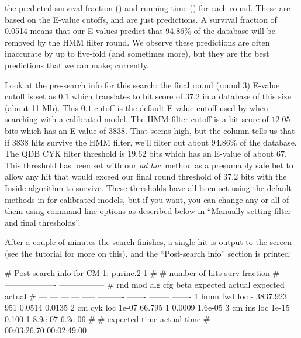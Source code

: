 \begin{wideitem}
\item[\emprog{predictions}] the predicted survival fraction
  () and running time () for each
  round. These are based on the E-value cutoffs, and are just
  predictions. A survival fraction of 0.0514 means that our E-values
  predict that 94.86\% of the database will be removed by the HMM
  filter round. We observe these predictions are often inaccurate by up
  to five-fold (and sometimes more), but they are the best predictions
  that we can make; currently.
\end{wideitem}

Look at the pre-search info for this search: the final round (round 3)
E-value cutoff is set as $0.1$ which translates to bit score of $37.2$
in a database of this size (about 11 Mb). This $0.1$ cutoff is the
default E-value cutoff used by  when searching with a
calibrated model. The HMM filter cutoff is a bit score of $12.05$ bits
which has an E-value of $3838$.  That seems high, but the 
column tells us that if $3838$ hits survive the HMM filter, we'll
filter out about $94.86\%$ of the database. The QDB CYK filter
threshold is $19.62$ bits which has an E-value of about $67$. This
threshold has been set with our \emph{ad hoc} method as a presumably
safe bet to allow any hit that would exceed our final round threshold
of $37.2$ bits with the Inside algorithm to survive. These thresholds
have all been set using the default methods in  for
calibrated models, but if you want, you can change any or all of them
using command-line options as described below in ``Manually setting
filter and final thresholds''.

After a couple of minutes the search finishes, a single hit is output
to the screen (see the tutorial for more on this), and the
``Post-search info'' section is printed:

\begin{sreoutput}
# Post-search info for CM 1: purine.2-1
#
#                              number of hits       surv fraction  
#                            -------------------  -----------------
# rnd  mod  alg  cfg   beta    expected   actual  expected   actual
# ---  ---  ---  ---  -----  ----------  -------  --------  -------
    1  hmm  fwd  loc      -    3837.923      951    0.0514   0.0135
    2   cm  cyk  loc  1e-07      66.795        1    0.0009  1.6e-05
    3   cm  ins  loc  1e-15       0.100        1   8.9e-07  6.2e-06
#
# expected time    actual time
# -------------  -------------
    00:03:26.70    00:02:49.00
\end{sreoutput}

